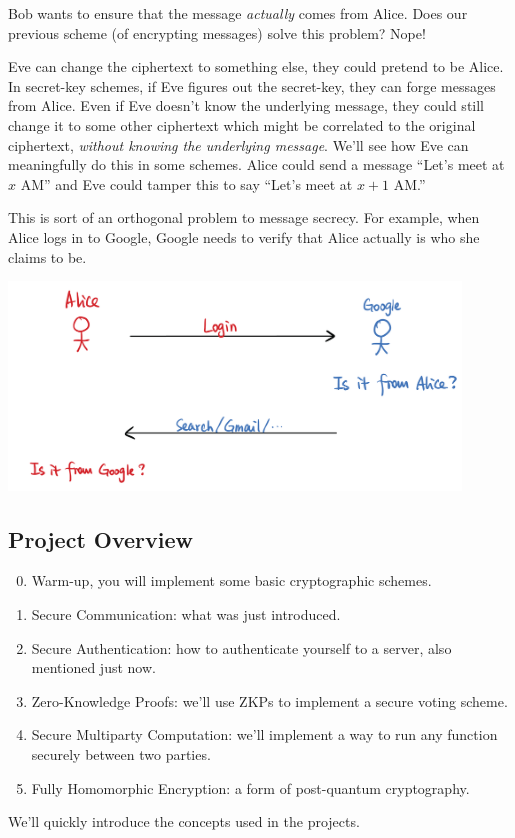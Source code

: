 Bob wants to ensure that the message \emph{actually} comes from Alice. Does our previous scheme (of encrypting messages) solve this problem? Nope!

Eve can change the ciphertext to something else, they could pretend to be Alice. In secret-key schemes, if Eve figures out the secret-key, they can forge messages from Alice. Even if Eve doesn't know the underlying message, they could still change it to some other ciphertext which might be correlated to the original ciphertext, \emph{without knowing the underlying message}. We'll see how Eve can meaningfully do this in some schemes. Alice could send a message ``Let's meet at $x$ AM'' and Eve could tamper this to say ``Let's meet at $x+1$ AM.''

This is sort of an orthogonal problem to message secrecy. For example, when Alice logs in to Google, Google needs to verify that Alice actually is who she claims to be.

\begin{center}
    \includegraphics[width=0.9\textwidth]{images/2023-01-26/authentication.png}
\end{center}

\subsection{Project Overview}
\begin{enumerate}
    \setcounter{enumi}{-1}
    \item Warm-up, you will implement some basic cryptographic schemes.
    \item Secure Communication: what was just introduced.
    \item Secure Authentication: how to authenticate yourself to a server, also mentioned just now.
    \item Zero-Knowledge Proofs: we'll use ZKPs to implement a secure voting scheme.
    \item Secure Multiparty Computation: we'll implement a way to run any function securely between two parties.
    \item Fully Homomorphic Encryption: a form of post-quantum cryptography.
\end{enumerate}
We'll quickly introduce the concepts used in the projects.

